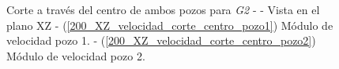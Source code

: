 \documentclass[10pt,a4paper,final]{article}
\begin{document}
%
%
\begin{figure}[H]
   \centering
   \hspace{0.1\linewidth}
    \caption{Corte a través del centro de ambos pozos para \emph{G2} -  - Vista en el plano XZ - (\ref{200_XZ_velocidad_corte_centro_pozo1}) Módulo de velocidad pozo 1. - (\ref{200_XZ_velocidad_corte_centro_pozo2}) Módulo de velocidad pozo 2.}
   \label{200_XZ_velocidad_corte_centro_pozos}                %
\end{figure}
\end{document}
